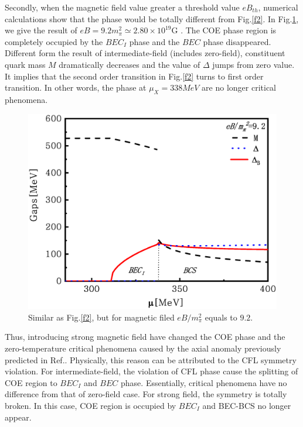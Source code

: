 \documentclass[prd, showpacs,nofootinbib,amsmath,amssymb,12pt]{revtex4}
\begin{document}
Secondly, when the magnetic field value greater a threshold value $eB_{th}$, 
numerical calculations show that the phase would be totally different from Fig.\ref{f2}.
In Fig.\ref{f3}, we give the result of $eB = 9.2m^2_\pi \simeq 2.80\times10^{19}$G .
The COE phase region is completely occupied by the $BEC_I$ phase and the $BEC$ phase disappeared. 
Different form the result of intermediate-field (includes zero-field),
constituent quark mass $M$ dramatically decreases and the value of $\Delta$ jumps from zero value.
It implies that the second order transition in Fig.\ref{f2} turns to first order transition.
In other words, the phase at $\mu_X=338MeV$ are no longer critical phenomena.

\begin{figure}[ht]
	\centering
	\includegraphics[scale=0.3]{2.eps}
	\caption{Similar as Fig.\ref{f2}, but for magnetic filed $eB/m^2_\pi$ equals to $9.2$.}
	\label{f3}
\end{figure}

Thus, introducing strong magnetic field have changed the COE phase and the zero-temperature critical phenomena caused by the axial anomaly previously predicted in Ref.\cite{abuki2010nambu}.
Physically, this reason can be attributed to the CFL symmetry violation.
For intermediate-field, the violation of CFL phase cause the splitting of COE region to $BEC_I$ and $BEC$ phase.
Essentially,  critical phenomena have no difference from that of zero-field case.
For strong field, the symmetry is totally broken. 
In this case, COE region is occupied by $BEC_I$ and BEC-BCS no longer appear.
\end{document}
